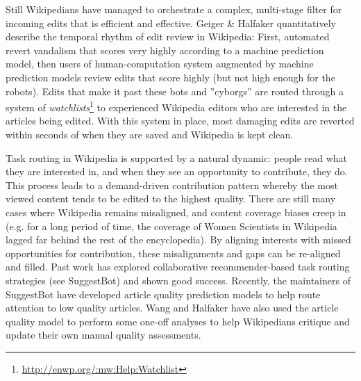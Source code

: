Still Wikipedians have managed to orchestrate a complex, multi-stage filter for incoming edits that is efficient and effective.  Geiger \& Halfaker quantitatively describe the temporal rhythm of edit review in Wikipedia\cite{geiger2013levee}: First, automated revert vandalism that scores very highly according to a machine prediction model, then users of human-computation system augmented by machine prediction models review edits that score highly (but not high enough for the robots).  Edits that make it past these bots and ''cyborgs''\cite{halfaker2012bots} are routed through a system of \emph{watchlists}\footnote{\url{http://enwp.org/:mw:Help:Watchlist}} to experienced Wikipedia editors who are interested in the articles being edited.  With this system in place, most damaging edits are reverted within seconds of when they are saved\cite{geiger2013levee} and Wikipedia is kept clean.

 Task routing in Wikipedia is supported by a natural dynamic: people read what they are interested in, and when they see an opportunity to contribute, they do.  This process leads to a demand-driven contribution pattern whereby the most viewed content tends to be edited to the highest quality\cite{hill2014consider}.  There are still many cases where Wikipedia remains misaligned\cite{wang2015misalignment}, and content coverage biases creep in (e.g. for a long period of time, the coverage of Women Scientists in Wikipedia lagged far behind the rest of the encyclopedia\cite{halfaker2017interpolating}).  By aligning interests with missed opportunities for contribution, these misalignments and gaps can be re-aligned and filled.  Past work has explored collaborative recommender-based task routing strategies (see SuggestBot\cite{cosley2007suggestbot}) and shown good success.  Recently, the maintainers of SuggestBot have developed article quality prediction models to help route attention to low quality articles\cite{wang2013tell}.  Wang and Halfaker have also used the article quality model to perform some one-off analyses to help Wikipedians critique and update their own manual quality assessments\cite{wang2014screening}.

